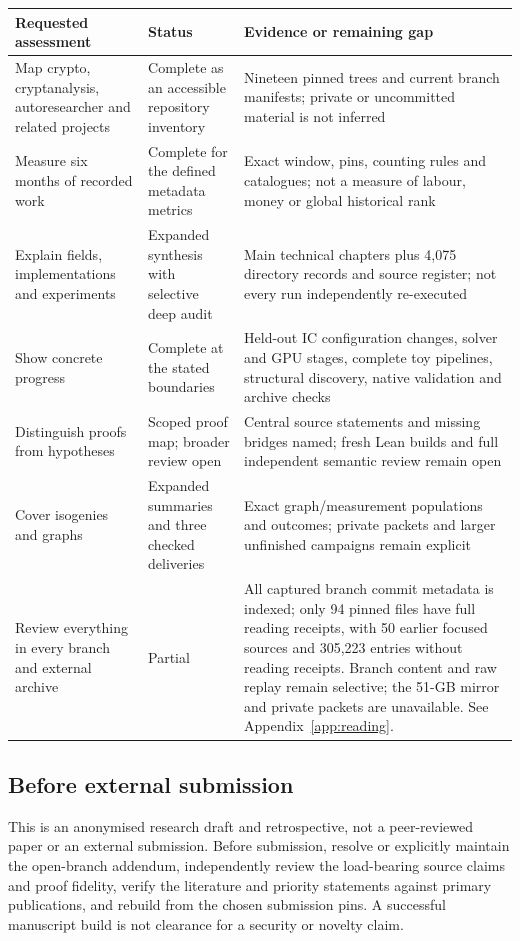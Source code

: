 \begin{longtable}{@{}p{4.2cm}p{3cm}p{6.2cm}@{}}\toprule
Requested assessment & Status & Evidence or remaining gap \\\midrule\endhead
Map crypto, cryptanalysis, autoresearcher and related projects & Complete
as an accessible repository inventory & Nineteen pinned trees and current
branch manifests; private or uncommitted material is not inferred \\
Measure six months of recorded work & Complete for the defined metadata
metrics & Exact window, pins, counting rules and catalogues; not a measure
of labour, money or global historical rank \\
Explain fields, implementations and experiments & Expanded
synthesis with selective deep audit & Main technical chapters plus
4,075 directory records and source register; not every run independently
re-executed \\
Show concrete progress & Complete at the stated boundaries & Held-out
IC configuration changes, solver and GPU stages, complete toy pipelines,
structural discovery, native validation and archive checks \\
Distinguish proofs from hypotheses & Scoped proof map; broader review open &
Central source statements and missing bridges named; fresh Lean builds
and full independent semantic review remain open \\
Cover isogenies and graphs & Expanded summaries and three checked
deliveries & Exact graph/measurement populations and outcomes;
private packets and larger unfinished campaigns remain explicit \\
Review everything in every branch and external archive & Partial &
All captured branch commit metadata is indexed; only 94 pinned files have
full reading receipts, with 50 earlier focused sources and 305,223 entries
without reading receipts. Branch content and raw replay remain selective;
the 51-GB mirror and private packets are unavailable. See
Appendix~\ref{app:reading}. \\\bottomrule
\end{longtable}

\subsection{Before external submission}

This is an anonymised research draft and retrospective, not a
peer-reviewed paper or an external submission. Before submission, resolve
or explicitly maintain the open-branch addendum, independently review
the load-bearing source claims and proof fidelity, verify the literature
and priority statements against primary publications, and rebuild from
the chosen submission pins. A successful manuscript build is not
clearance for a security or novelty claim.
